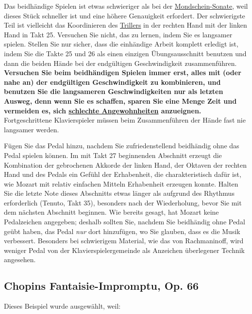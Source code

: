 Das beidhändige Spielen ist etwas schwieriger als bei der \hyperref[c1ii25b]{Mondschein-Sonate}, weil dieses Stück schneller ist und eine höhere Genauigkeit erfordert.
Der schwierigste Teil ist vielleicht das Koordinieren des \hyperref[c1iii3]{Trillers} in der rechten Hand mit der linken Hand in Takt 25.
Versuchen Sie nicht, das zu lernen, indem Sie es langsamer spielen.
Stellen Sie nur sicher, dass die einhändige Arbeit komplett erledigt ist, indem Sie die Takte 25 und 26 als einen einzigen Übungsausschnitt benutzen und dann die beiden Hände bei der endgültigen Geschwindigkeit zusammenführen.
\textbf{Versuchen Sie beim beidhändigen Spielen immer erst, alles mit (oder nahe an) der endgültigen Geschwindigkeit zu kombinieren, 
und benutzen Sie die langsameren Geschwindigkeiten nur als letzten Ausweg, denn wenn Sie es schaffen, sparen Sie eine Menge Zeit und vermeiden es, sich \hyperref[c1ii22]{schlechte Angewohnheiten} anzueignen.}
Fortgeschrittene Klavierspieler müssen beim Zusammenführen der Hände fast nie langsamer werden.

Fügen Sie das Pedal hinzu, nachdem Sie zufriedenstellend beidhändig ohne das Pedal spielen können.
Im mit Takt 27 beginnenden Abschnitt erzeugt die Kombination der gebrochenen Akkorde der linken Hand, der Oktaven der rechten Hand und des Pedals ein Gefühl der Erhabenheit, die charakteristisch dafür ist, wie Mozart mit relativ einfachen Mitteln Erhabenheit erzeugen konnte.
Halten Sie die letzte Note dieses Abschnitts etwas länger als aufgrund des Rhythmus erforderlich (Tenuto, Takt 35), besonders nach der Wiederholung, bevor Sie mit dem nächsten Abschnitt beginnen.
Wie bereits gesagt, hat Mozart keine Pedalzeichen angegeben; deshalb sollten Sie, nachdem Sie beidhändig ohne Pedal geübt haben, das Pedal \textit{nur} dort hinzufügen, wo Sie glauben, dass es die Musik verbessert.
Besonders bei schwierigem Material, wie das von Rachmaninoff, wird weniger Pedal von der Klavierspielergemeinde als Anzeichen überlegener Technik angesehen.


\hypertarget{FI}{}
\subsection{Chopins Fantaisie-Impromptu, Op. 66}
\label{c1ii25d}

Dieses Beispiel wurde ausgewählt, weil:


